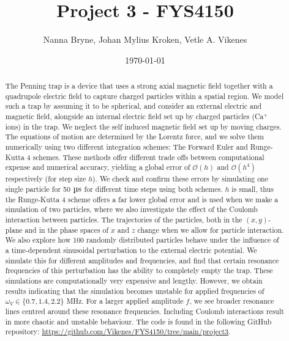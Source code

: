 



\title{Project 3 - FYS4150} 
\author{Nanna Bryne, Johan Mylius Kroken, Vetle A. Vikenes} 
\date{\today}                             
\noaffiliation                            

\begin{abstract}
    The Penning trap is a device that uses a strong axial magnetic field together with a quadrupole electric field to capture charged particles within a spatial region. We model such a trap by assuming it to be spherical, and consider an external electric and magnetic field, alongside an internal electric field set up by charged particles (Ca$^+$ ions) in the trap. We neglect the self induced magnetic field set up by moving charges. The equations of motion are determined by the Lorentz force, and we solve them numerically using two different integration schemes: The Forward Euler and Runge-Kutta 4 schemes. These methods offer different trade offs between computational expense and numerical accuracy, yielding a global error of $\mathcal{O}(h)$ and $\mathcal{O}(h^4)$ respectively (for step size $h$). We check and confirm these errors by simulating one single particle for 50 $\mus$ for different time steps using both schemes. $h$ is small, thus the Runge-Kutta 4 scheme offers a far lower global error and is used when we make a simulation of two particles, where we also investigate the effect of the Coulomb interaction between particles. The trajectories of the particles, both in the $(x,y)$-plane and in the phase spaces of $x$ and $z$ change when we allow for particle interaction. We also explore how 100 randomly distributed particles behave under the influence of a time-dependent sinusoidal perturbation to the external electric potential. We simulate this for different amplitudes and frequencies, and find that certain resonance frequencies of this perturbation has the ability to completely empty the trap. These simulations are computationally very expensive and lengthy. However, we obtain results indicating that the simulation becomes unstable for applied frequencies of $\omega_V\in\{0.7,1.4, 2.2\}$ MHz. For a larger applied amplitude $f$, we see broader resonance lines centred around these resonance frequencies. Including Coulomb interactions result in more chaotic and unstable behaviour. The code is found in the following GitHub repository: \url{https://github.com/Vikenes/FYS4150/tree/main/project3}.
\end{abstract}
\maketitle














 



